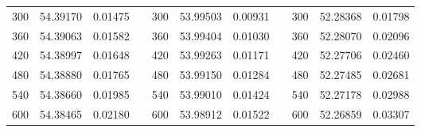 \begin{table}[]
\begin{tabular}{ccccccccccc}
\multicolumn{1}{|c|}{300}         & \multicolumn{1}{c|}{54.39170} & \multicolumn{1}{c|}{0.01475}        & \multicolumn{1}{c|}{} & \multicolumn{1}{c|}{300}         & \multicolumn{1}{c|}{53.99503} & \multicolumn{1}{c|}{0.00931}        & \multicolumn{1}{c|}{} & \multicolumn{1}{c|}{300}         & \multicolumn{1}{c|}{52.28368} & \multicolumn{1}{c|}{0.01798}        \\ \cline{1-3} \cline{5-7} \cline{9-11} 
\multicolumn{1}{|c|}{360}         & \multicolumn{1}{c|}{54.39063} & \multicolumn{1}{c|}{0.01582}        & \multicolumn{1}{c|}{} & \multicolumn{1}{c|}{360}         & \multicolumn{1}{c|}{53.99404} & \multicolumn{1}{c|}{0.01030}        & \multicolumn{1}{c|}{} & \multicolumn{1}{c|}{360}         & \multicolumn{1}{c|}{52.28070} & \multicolumn{1}{c|}{0.02096}        \\ \cline{1-3} \cline{5-7} \cline{9-11} 
\multicolumn{1}{|c|}{420}         & \multicolumn{1}{c|}{54.38997} & \multicolumn{1}{c|}{0.01648}        & \multicolumn{1}{c|}{} & \multicolumn{1}{c|}{420}         & \multicolumn{1}{c|}{53.99263} & \multicolumn{1}{c|}{0.01171}        & \multicolumn{1}{c|}{} & \multicolumn{1}{c|}{420}         & \multicolumn{1}{c|}{52.27706} & \multicolumn{1}{c|}{0.02460}        \\ \cline{1-3} \cline{5-7} \cline{9-11} 
\multicolumn{1}{|c|}{480}         & \multicolumn{1}{c|}{54.38880} & \multicolumn{1}{c|}{0.01765}        & \multicolumn{1}{c|}{} & \multicolumn{1}{c|}{480}         & \multicolumn{1}{c|}{53.99150} & \multicolumn{1}{c|}{0.01284}        & \multicolumn{1}{c|}{} & \multicolumn{1}{c|}{480}         & \multicolumn{1}{c|}{52.27485} & \multicolumn{1}{c|}{0.02681}        \\ \cline{1-3} \cline{5-7} \cline{9-11} 
\multicolumn{1}{|c|}{540}         & \multicolumn{1}{c|}{54.38660} & \multicolumn{1}{c|}{0.01985}        & \multicolumn{1}{c|}{} & \multicolumn{1}{c|}{540}         & \multicolumn{1}{c|}{53.99010} & \multicolumn{1}{c|}{0.01424}        & \multicolumn{1}{c|}{} & \multicolumn{1}{c|}{540}         & \multicolumn{1}{c|}{52.27178} & \multicolumn{1}{c|}{0.02988}        \\ \cline{1-3} \cline{5-7} \cline{9-11} 
\multicolumn{1}{|c|}{600}         & \multicolumn{1}{c|}{54.38465} & \multicolumn{1}{c|}{0.02180}        & \multicolumn{1}{c|}{} & \multicolumn{1}{c|}{600}         & \multicolumn{1}{c|}{53.98912} & \multicolumn{1}{c|}{0.01522}        & \multicolumn{1}{c|}{} & \multicolumn{1}{c|}{600}         & \multicolumn{1}{c|}{52.26859} & \multicolumn{1}{c|}{0.03307}        \\ \cline{1-3} \cline{5-7} \cline{9-11} 
\end{tabular}
\end{table}

